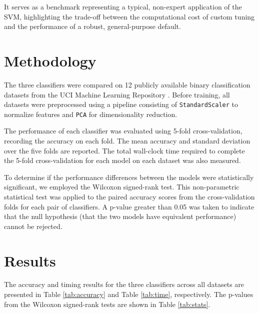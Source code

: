 \documentclass[conference]{IEEEtran}
\begin{document}
It serves as a benchmark representing a typical, non-expert application of the SVM, highlighting the trade-off between the computational cost of custom tuning and the performance of a robust, general-purpose default.

\section{Methodology}
The three classifiers were compared on 12 publicly available binary classification datasets from the UCI Machine Learning Repository \cite{b3}. Before training, all datasets were preprocessed using a pipeline consisting of \texttt{StandardScaler} to normalize features and \texttt{PCA} for dimensionality reduction.

The performance of each classifier was evaluated using 5-fold cross-validation, recording the accuracy on each fold. The mean accuracy and standard deviation over the five folds are reported. The total wall-clock time required to complete the 5-fold cross-validation for each model on each dataset was also measured.

To determine if the performance differences between the models were statistically significant, we employed the Wilcoxon signed-rank test. This non-parametric statistical test was applied to the paired accuracy scores from the cross-validation folds for each pair of classifiers. A p-value greater than 0.05 was taken to indicate that the null hypothesis (that the two models have equivalent performance) cannot be rejected.

\section{Results}
The accuracy and timing results for the three classifiers across all datasets are presented in Table \ref{tab:accuracy} and Table \ref{tab:time}, respectively. The p-values from the Wilcoxon signed-rank tests are shown in Table \ref{tab:stats}.
\end{document}
